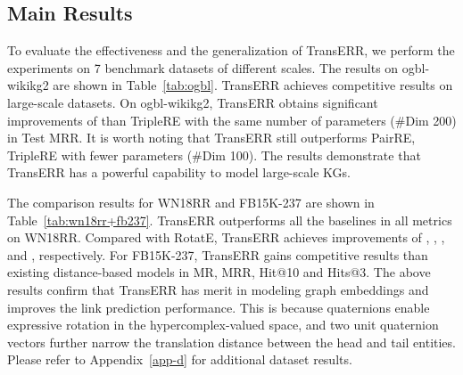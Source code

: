 \documentclass[11pt]{article}
\begin{document}
\subsection{Main Results}\label{sec6.1}

To evaluate the effectiveness and the generalization of TransERR, we perform the experiments on 7 benchmark datasets of different scales. The results on ogbl-wikikg2 are shown in Table~\ref{tab:ogbl}. TransERR achieves competitive results on large-scale datasets. On ogbl-wikikg2,  TransERR obtains significant improvements of  than TripleRE with the same number of parameters (\#Dim 200) in Test MRR.  It is worth noting that TransERR still outperforms PairRE, TripleRE with fewer parameters (\#Dim 100). The results demonstrate that TransERR has a powerful capability to model large-scale KGs.








The comparison results for WN18RR and FB15K-237 are shown in Table~\ref{tab:wn18rr+fb237}. TransERR outperforms all the baselines in all metrics on WN18RR. Compared with RotatE, TransERR achieves improvements of , , ,  and , respectively. For FB15K-237, TransERR gains competitive results than existing distance-based models in MR, MRR, Hit@10 and Hits@3. The above results confirm that TransERR has merit in modeling graph embeddings and improves the link prediction performance. This is because quaternions enable expressive rotation in the hypercomplex-valued space, and two unit quaternion vectors further narrow the translation distance between the head and tail entities. Please refer to Appendix~\ref{app-d} for additional dataset results. 




	
\end{document}
